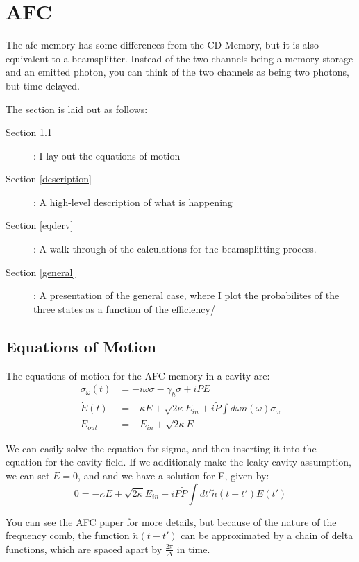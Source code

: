 \documentclass[12pt]{article}
\begin{document}
\section{AFC}

The afc memory has some differences from the CD-Memory, but it is also equivalent to a beamsplitter. Instead of the two channels being a memory storage and an emitted photon, you can think of the two channels as being two photons, but time delayed.

The section is laid out as follows:
\begin{description}
\item[ Section \ref{eqmot}]: I lay out the equations of motion
\item[ Section \ref{description}]: A high-level description of what is happening
\item [Section \ref{eqderv}]: A walk through of the calculations for the beamsplitting process.
\item [Section \ref{general}]: A presentation of the general case, where I plot the probabilites of the three states as a 
function of the efficiency/
\end{description}

\subsection{Equations of Motion}
\label{eqmot}
The equations of motion for the AFC memory in a cavity are:
\begin{align}
\dot{\sigma}_\omega (t) &= -i \omega \sigma - \gamma_h \sigma + i P E \\
\dot{E} (t) & = -\kappa E +\sqrt{2 \kappa} E_{in} + i \tilde{P} \int d \omega n(\omega) \sigma_\omega \\
E_{out} &= -E_{in} + \sqrt{2 \kappa} E
\end{align}

We can easily solve the equation for sigma, and then inserting it into the equation for
the cavity field. If we additionaly make the leaky cavity assumption, we can set $\dot{E} = 0$, and
and we have a solution for E, given by:
\begin{equation}
0 = -\kappa E +\sqrt{2 \kappa} E_{in} + i P \tilde{P} \int dt' \tilde{n} (t-t') E(t')
\end{equation}

You can see the AFC paper for more details, but because of the nature of the frequency
comb, the function $\tilde{n}(t-t')$ can be approximated by a chain of delta functions,
which are spaced apart by $\frac{2 \pi}{\Delta}$ in time.
\end{document}
